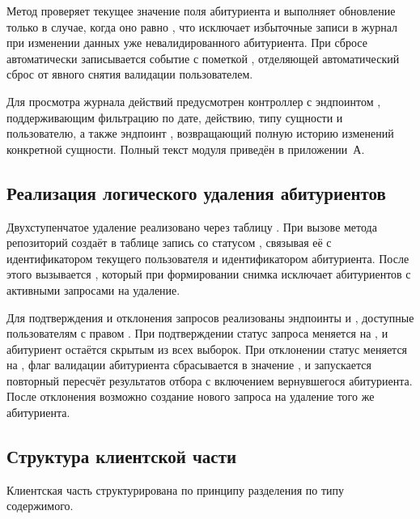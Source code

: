 Метод  проверяет текущее значение поля  абитуриента и выполняет обновление только в случае, когда оно равно , что исключает избыточные записи в журнал при изменении данных уже невалидированного абитуриента.
При сбросе автоматически записывается событие  с пометкой , отделяющей автоматический сброс от явного снятия валидации пользователем.

Для просмотра журнала действий предусмотрен контроллер  с эндпоинтом , поддерживающим фильтрацию по дате, действию, типу сущности и пользователю, а также эндпоинт , возвращающий полную историю изменений конкретной сущности.
Полный текст модуля  приведён в приложении~А.

\subsection{Реализация логического удаления абитуриентов}

Двухступенчатое удаление реализовано через таблицу .
При вызове метода  репозиторий создаёт в таблице запись со статусом , связывая её с идентификатором текущего пользователя и идентификатором абитуриента.
После этого вызывается , который при формировании снимка исключает абитуриентов с активными запросами на удаление.

Для подтверждения и отклонения запросов реализованы эндпоинты  и , доступные пользователям с правом .
При подтверждении статус запроса меняется на , и абитуриент остаётся скрытым из всех выборок.
При отклонении статус меняется на , флаг валидации абитуриента сбрасывается в значение , и запускается повторный пересчёт результатов отбора с включением вернувшегося абитуриента.
После отклонения возможно создание нового запроса на удаление того же абитуриента.

\subsection{Структура клиентской части}

Клиентская часть структурирована по принципу разделения по типу содержимого.

